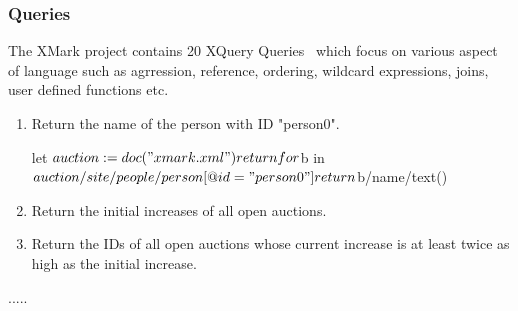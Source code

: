 \subsubsection{Queries}
The XMark project contains 20 XQuery Queries~\cite{xmark/original} which focus on various aspect of language such as agrression, reference, ordering, wildcard expressions, joins, user defined functions etc.\cite{xmark/mlynkova2008xml}
\label{xmark-queries}
	\begin{enumerate}[label=Q\arabic*.]
		\item Return the name of the person with ID "person0". \\
		\begin{fakeXML}
			let $auction := doc("xmark.xml") return
			for $b in $auction/site/people/person[@id = "person0"]
			return $b/name/text()
		\end{fakeXML}
		\item Return the initial increases of all open auctions. \\
		\item Return the IDs of all open auctions whose current increase is at least twice as high as the initial increase. \\
	\end{enumerate}
	.....